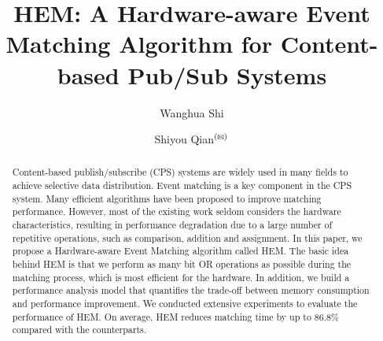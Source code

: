 \documentclass[runningheads]{llncs}
\title{HEM: A Hardware-aware Event Matching Algorithm for Content-based Pub/Sub Systems}
\begin{document}
%

\author{Wanghua Shi \and Shiyou Qian$\textsuperscript{(\Letter)}$}
%
%
\maketitle              %
%

\begin{abstract}
Content-based publish/subscribe (CPS) systems are widely used in many fields to achieve selective data distribution. Event matching is a key component in the CPS system. Many efficient algorithms have been proposed to improve matching performance. However, most of the existing work seldom considers the hardware characteristics, resulting in performance degradation due to a large number of repetitive operations, such as comparison, addition and assignment. In this paper, we propose a Hardware-aware Event Matching algorithm called HEM. The basic idea behind HEM is that we perform as many bit OR operations as possible during the matching process, which is most efficient for the hardware. In addition, we build a performance analysis model that quantifies the trade-off between memory consumption and performance improvement. We conducted extensive experiments to evaluate the performance of HEM. On average, HEM reduces matching time by up to 86.8\% compared with the counterparts. 


\end{abstract}
\end{document}
